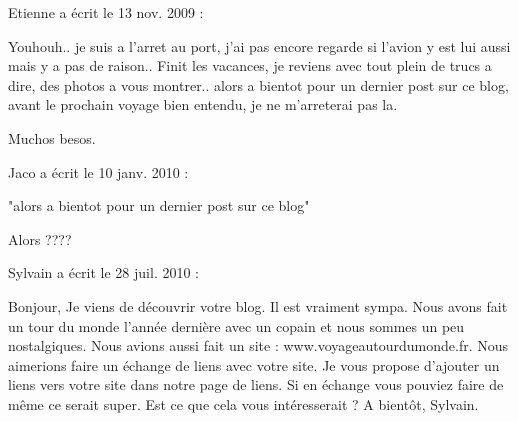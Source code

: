 \medskip
Etienne a écrit le 13 nov. 2009 :
\begin{displayquote}
Youhouh.. je suis a l'arret au port, j'ai pas encore regarde si l'avion y est lui aussi mais y a pas de raison..
Finit les vacances, je reviens avec tout plein de trucs a dire, des photos a vous montrer.. alors a bientot pour un dernier post sur ce blog, avant le prochain voyage bien entendu, je ne m'arreterai pas la.

Muchos besos.
\end{displayquote}

\medskip
Jaco a écrit le 10 janv. 2010 :
\begin{displayquote}
"alors a bientot pour un dernier post sur ce blog"

Alors ????
\end{displayquote}

\medskip
Sylvain a écrit le 28 juil. 2010 :
\begin{displayquote}
Bonjour,
Je viens de découvrir votre blog. Il est vraiment sympa. Nous avons fait un tour du monde l'année dernière avec un copain et nous sommes un peu nostalgiques.
Nous avions aussi fait un site : www.voyageautourdumonde.fr. Nous aimerions faire un échange de liens avec votre site. Je vous propose d'ajouter un liens vers votre site dans notre page de liens. Si en échange vous pouviez faire de même ce serait super.
Est ce que cela vous intéresserait ?
A bientôt,
Sylvain.
\end{displayquote}

\vfill
